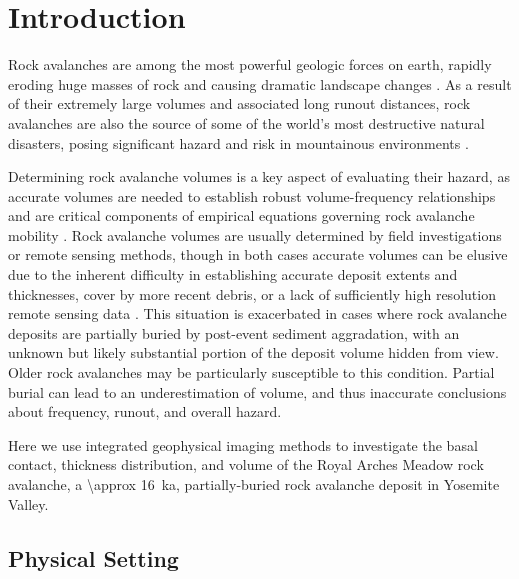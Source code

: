 \documentclass[utf8]{frontiersSCNS}
\begin{document}






\section{Introduction}\label{sec:intro}

Rock avalanches are among the most powerful geologic forces on earth, rapidly eroding huge masses of rock and causing dramatic landscape changes \citep[e.g.][]{evans2006landslides, hovius2006landslide, korup2007giant, hewitt2008legacies}. As a result of their extremely large volumes and associated long runout distances, rock avalanches are also the source of some of the world’s most destructive natural disasters, posing significant hazard and risk in mountainous environments \citep{evans2006landslides}.

Determining rock avalanche volumes is a key aspect of evaluating their hazard, as accurate volumes are needed to establish robust volume-frequency relationships \citep[e.g.][]{evans2006landslides} and are critical components of empirical equations governing rock avalanche mobility \citep[e.g.][]{davies1999runout, bowman2012physical}.  Rock avalanche volumes are usually determined by field investigations or remote sensing methods, though in both cases accurate volumes can be elusive due to the inherent difficulty in establishing accurate deposit extents and thicknesses, cover by more recent debris, or a lack of sufficiently high resolution remote sensing data \citep{hutchinson2006massive}. This situation is exacerbated in cases where rock avalanche deposits are partially buried by post-event sediment aggradation, with an unknown but likely substantial portion of the deposit volume hidden from view.  Older rock avalanches may be particularly susceptible to this condition. Partial burial can lead to an underestimation of volume, and thus inaccurate conclusions about frequency, runout, and overall hazard.

Here we use integrated geophysical imaging methods to investigate the basal contact, thickness distribution, and volume of the Royal Arches Meadow rock avalanche, a \SI{\approx 16}{\kilo a}, partially-buried rock avalanche deposit in Yosemite Valley.




\subsection{Physical Setting}
\end{document}
